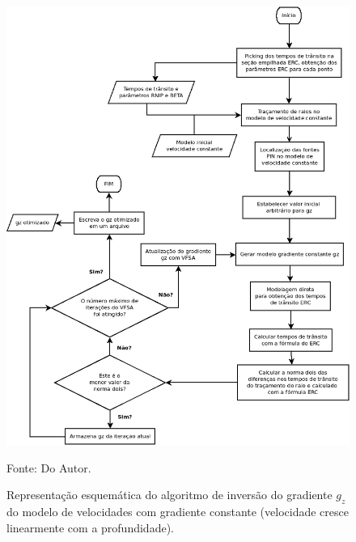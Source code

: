 \begin{figure}[H]
\caption{Representação esquemática do algoritmo de inversão do gradiente $g_z$ do modelo de velocidades
com gradiente constante (velocidade cresce linearmente com a profundidade).}
\begin{center}
\includegraphics[scale=0.5]{images/fluxogz.png}
\vspace{-0.3cm}
\end{center}
\begin{center}
 Fonte: Do Autor.
\end{center}
\label{fig:10.2}
\end{figure}


